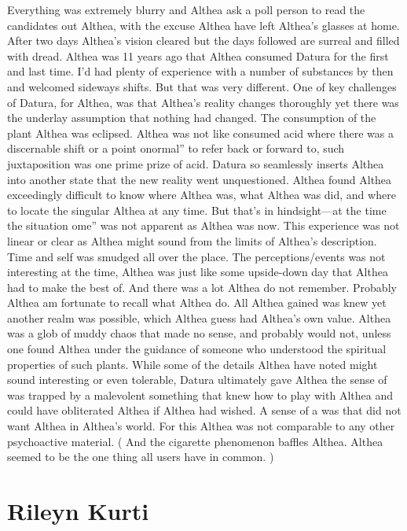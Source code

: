 \documentclass[12pt]{book}
\begin{document}
Everything was extremely blurry and Althea ask a poll person to read the candidates out Althea, with the excuse Althea have left Althea's glasses at home. After two days Althea's vision cleared but the days followed are surreal and filled with dread. Althea was 11 years ago that Althea consumed Datura for the first and last time. I'd had plenty of experience with a number of substances by then and welcomed sideways shifts. But that was very different. One of key challenges of Datura, for Althea, was that Althea's reality changes thoroughly yet there was the underlay assumption that nothing had changed. The consumption of the plant Althea was eclipsed. Althea was not like consumed acid where there was a discernable shift or a point onormal'' to refer back or forward to, such juxtaposition was one prime prize of acid. Datura so seamlessly inserts Althea into another state that the new reality went unquestioned. Althea found Althea exceedingly difficult to know where Althea was, what Althea was did, and where to locate the singular Althea at any time. But that's in hindsight---at the time the situation ome'' was not apparent as Althea was now. This experience was not linear or clear as Althea might sound from the limits of Althea's description. Time and self was smudged all over the place. The perceptions/events was not interesting at the time, Althea was just like some upside-down day that Althea had to make the best of. And there was a lot Althea do not remember. Probably Althea am fortunate to recall what Althea do. All Althea gained was knew yet another realm was possible, which Althea guess had Althea's own value. Althea was a glob of muddy chaos that made no sense, and probably would not, unless one found Althea under the guidance of someone who understood the spiritual properties of such plants. While some of the details Althea have noted might sound interesting or even tolerable, Datura ultimately gave Althea the sense of was trapped by a malevolent something that knew how to play with Althea and could have obliterated Althea if Althea had wished. A sense of a was that did not want Althea in Althea's world. For this Althea was not comparable to any other psychoactive material. ( And the cigarette phenomenon baffles Althea. Althea seemed to be the one thing all users have in common. )



\chapter{Rileyn Kurti}
\end{document}
